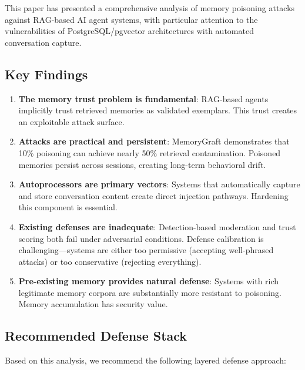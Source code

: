 This paper has presented a comprehensive analysis of memory poisoning attacks against RAG-based AI agent systems, with particular attention to the vulnerabilities of PostgreSQL/pgvector architectures with automated conversation capture.

\subsection{Key Findings}

\begin{enumerate}
    \item \textbf{The memory trust problem is fundamental}: RAG-based agents implicitly trust retrieved memories as validated exemplars. This trust creates an exploitable attack surface.

    \item \textbf{Attacks are practical and persistent}: MemoryGraft demonstrates that 10\% poisoning can achieve nearly 50\% retrieval contamination. Poisoned memories persist across sessions, creating long-term behavioral drift.

    \item \textbf{Autoprocessors are primary vectors}: Systems that automatically capture and store conversation content create direct injection pathways. Hardening this component is essential.

    \item \textbf{Existing defenses are inadequate}: Detection-based moderation and trust scoring both fail under adversarial conditions. Defense calibration is challenging---systems are either too permissive (accepting well-phrased attacks) or too conservative (rejecting everything).

    \item \textbf{Pre-existing memory provides natural defense}: Systems with rich legitimate memory corpora are substantially more resistant to poisoning. Memory accumulation has security value.
\end{enumerate}

\subsection{Recommended Defense Stack}

Based on this analysis, we recommend the following layered defense approach:


